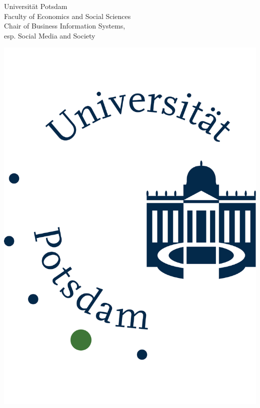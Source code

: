 \begin{titlepage}
\begin{center}
				
				\begin{minipage}[t]{11cm}
							\vspace*{0.1cm}
							Universität Potsdam \\
							Faculty of Economics and Social Sciences\\
							Chair of Business Information Systems,\\
							esp. Social Media and Society
				\end{minipage}
				\begin{minipage}[t]{3cm} \vspace{-\ht\strutbox}
							\begin{center} 
							\includegraphics[width=\textwidth]{assets/images/logo} \end{center}
				\end{minipage} 
				  

\end{center}
\end{titlepage}
